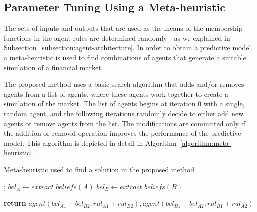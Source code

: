 \documentclass{ieeeaccess}
\begin{document}


\subsection{Parameter Tuning Using a Meta-heuristic} %
\label{subsection:meta-heuristic}

The sets of inputs and outputs that are used as the means of the
membership functions in the agent rules are determined randomly---as
we explained in Subsection~\ref{subsection:agent-architecture}. In
order to obtain a predictive model, a meta-heuristic is used to find
combinations of agents that generate a suitable simulation of a
financial market.

The proposed method uses a basic search algorithm that adds and/or removes
agents from a list of agents, where these agents work together to create a
simulation of the market. The list of agents begins at iteration 0 with a
single, random agent, and the following iterations randomly decide to either
add new agents or remove agents from the list. The modifications are committed
only if the addition or removal operation improves the performance of the
predictive model. This algorithm is depicted in detail in
Algorithm~\ref{algorithm:meta-heuristic}.

\begin{algorithm}
\caption{Meta-heuristic used to find a solution in the proposed method}
    \label{algorithm:meta-heuristic}
\begin{algorithmic}[1]
    ;
    \State $bel_A\gets extract\_beliefs(A)$
    \State $bel_B\gets extract\_beliefs(B)$

    \State \textbf{return} $agent(bel_{A1} + bel_{B2}, rul_{A1} + rul_{B2}),
    agent(bel_{B1} + bel_{A2}, rul_{B1} + rul_{A2})$
    \EndProcedure
\end{algorithmic}
\end{algorithm}
\end{document}

